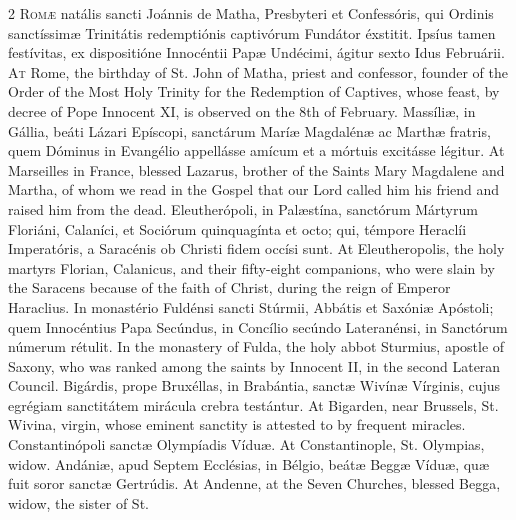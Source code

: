 \begin{paracol}{2}
\lettrine[lines=2]{R}{omæ} natális sancti Joánnis de Matha, 
 Presbyteri et Confessóris, qui Ordinis sanctíssimæ Trinitátis redemptiónis 
 captivórum Fundátor éxstitit. Ipsíus tamen festívitas, ex dispositióne 
 Innocéntii Papæ Undécimi, ágitur sexto Idus Februárii.
\switchcolumn
{}
\lettrine[lines=2]{A}{t} Rome, the birthday of St. John of Matha, priest and confessor, founder of 
 the Order of the Most Holy Trinity for the Redemption of Captives, whose 
 feast, by decree of Pope Innocent XI, is observed on the 8th of 
 February.
\switchcolumn*
{}
Massíliæ, in Gállia, beáti Lázari Epíscopi, 
 sanctárum Maríæ Magdalénæ ac Marthæ fratris, quem Dóminus in Evangélio 
 appellásse amícum et a mórtuis excitásse légitur.
\switchcolumn
{}
At Marseilles in France, blessed Lazarus, brother of the Saints Mary 
 Magdalene and Martha, of whom we read in the Gospel that our Lord called him 
 his friend and raised him from the dead.
\switchcolumn*
{}
Eleutherópoli, in Palæstína, sanctórum Mártyrum 
 Floriáni, Calaníci, et Sociórum quinquagínta et octo; qui, témpore Heraclíi 
 Imperatóris, a Saracénis ob Christi fidem occísi sunt.
\switchcolumn
{}
At 
 Eleutheropolis, the holy martyrs Florian, Calanicus, and their fifty-eight 
 companions, who were slain by the Saracens because of the faith of Christ, 
 during the reign of Emperor Haraclius.
\switchcolumn*
{}
In monastério Fuldénsi sancti Stúrmii, Abbátis et Saxóniæ 
 Apóstoli; quem Innocéntius Papa Secúndus, in Concílio secúndo Lateranénsi, 
 in Sanctórum númerum rétulit.
\switchcolumn
{}
In 
 the monastery of Fulda, the holy abbot Sturmius, apostle of Saxony, who was 
 ranked among the saints by Innocent II, in the second Lateran Council.
\switchcolumn*
{}
Bigárdis, prope Bruxéllas, in Brabántia, sanctæ 
 Wivínæ Vírginis, cujus egrégiam sanctitátem mirácula crebra testántur.
\switchcolumn
{}
At 
 Bigarden, near Brussels, St. Wivina, virgin, whose eminent sanctity is 
 attested to by frequent miracles.
\switchcolumn*
{}
Constantinópoli sanctæ Olympíadis Víduæ.
\switchcolumn
{}
At 
 Constantinople, St. Olympias, widow.
\switchcolumn*
{}
Andániæ, apud Septem Ecclésias, in Bélgio, 
 beátæ Beggæ Víduæ, quæ fuit soror sanctæ Gertrúdis.
\switchcolumn
{}
At 
 Andenne, at the Seven Churches, blessed Begga, widow, the sister of St. 

\end{paracol}
